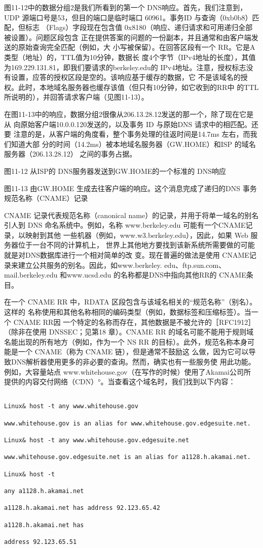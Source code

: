 图11-12中的数据分组2是我们所看到的第一个 DNS响应。首先，我们注意到，UDP
源端口号是53，但目的端口是临时端口 60961。事务ID 与查询（0xb0b8）匹配，但标志
（Flags）字段现在包含值 0x8180（响应、递归请求和可用递归全部被设置）。问题区段包含
正在提供答案的问题的一份副本，并且通常和由客户端发送的原始查询完全匹配（例如，大
小写被保留）。在回答区段有一个 RR。它是A类型（地址）的，TTL值为10分钟，数据长
度4个字节（IPv4地址的长度），其值为169.229.131.81，即我们要请求的berkeley.edu的
IPv4地址。注意，授权标志没有设置，应答的授权区段是空的。该响应基于缓存的数据，它
不是该域名的授权。此时，本地域名服务器也缓存该值（但只有10分钟，如它收到的RR中
的TTL 所说明的），并回答请求客户端（见图11-13）。

在图11-13中的响应，数据分组2很像从206.13.28.12发送的那一个，除了现在它是从
向原始客户端10.0.0.120发送的，以及事务 ID 与原始DNS 请求中的相匹配。还要
注意的是，从客户端的角度看，整个事务处理的往返时间是14.7ms 左右，而我们知道大部
分的时间（14.2ms）被本地域名服务器（GW.HOME）和ISP 的域名服务器（206.13.28.12）
之间的事务占据。

图11-12 从ISP的 DNS服务器发送到GW.HOME的一个标准的 DNS响应

图11-13
由GW.HOME 生成去往客户端的响应。这个消息完成了递归的DNS 事务
规范名称（CNAME）记录

CNAME 记录代表规范名称（canonical name）的记录，并用于将单一域名的别名引人到
DNS 命名系统中。例如，名称 www.berkeley.edu 可能有一个CNAME记录，以映射到其他
一些机器（例如，www.w3.berkeley.edu），因此，如果 Web 服务器位于一台不同的计算机上，
世界上其他地方要找到该新系统所需要做的可能就是对DNS数据库进行一个相对简单的改
变。现在普遍的做法是使用 CNAME记录来建立公共服务的别名。因此，如www.berkeley.
edu、ftp.sun.com、mail.berkeley.edu 和www.ucsd.edu 的名称都是DNS中指向其他RR的
CNAME条目。

在一个 CNAME RR 中，RDATA 区段包含与该域名相关的“规范名称”（别名）。这样的
名称使用和其他名称相同的编码类型（例如，数据标签和压缩标签）。当一个 CNAME RR因
一个特定的名称而存在，其他数据是不被允许的［RFC1912］（除非在使用 DNSSEC；见第18
章）。CNAME RR 的域名可能不能用于规则域名能出现的所有地方（例如，作为一个 NS RR
的目标）。此外，规范名称本身可能是一个 CNAME（称为 CNAME 链），但是通常不鼓励这
么做，因为它可以导致DNS解析器使用更多的非必要的查询。然而，确实也有一些服务使
用此功能。例如，大容量站点 www.whitehouse.gov（在写作的时候）使用了Akamai公司所
提供的内容交付网络（CDN）°。当查看这个域名时，我们找到以下内容：

\begin{verbatim}
    
Linux& host -t any www.whitehouse.gov

www.whitehouse.gov is an alias for www.whitehouse.gov.edgesuite.net.

Linux& host -t any www.whitehouse.gov.edgesuite.net

www.whitehouse.gov.edgesuite.net is an alias for a1128.h.akamai.net.

Linux& host -t

any a1128.h.akamai.net

a1128.h.akamai.net has address 92.123.65.42

a1128.h.akamai.net has

address 92.123.65.51
\end{verbatim}

